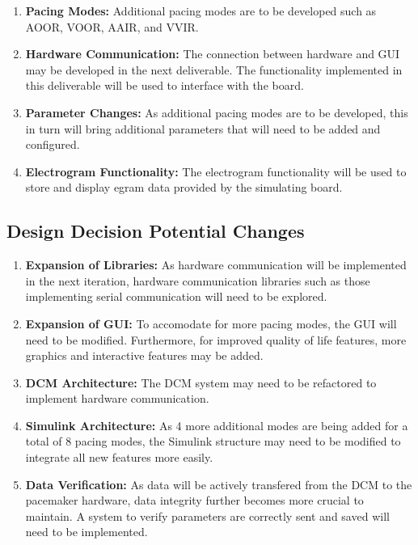 \documentclass{article}
\begin{document}
\begin{enumerate}[label=]
    \item \textbf{Pacing Modes:} Additional pacing modes are to be developed such as AOOR, VOOR, AAIR, and VVIR. 
    \item \textbf{Hardware Communication:} The connection between hardware and GUI may be developed in the next deliverable. 
    The functionality implemented in this deliverable will be used to interface with the board.
    \item \textbf{Parameter Changes:} As additional pacing modes are to be developed, this in turn will bring additional parameters that will 
    need to be added and configured. 
    \item \textbf{Electrogram Functionality:} The electrogram functionality will be used to store and display egram data provided by the 
    simulating board. 
\end{enumerate}


\subsection{Design Decision Potential Changes}

\begin{enumerate}[label=]
    \item \textbf{Expansion of Libraries:} As hardware communication will be implemented in the next iteration, 
    hardware communication libraries such as those implementing serial communication will need to be explored.
    \item \textbf{Expansion of GUI:} To accomodate for more pacing modes, the GUI will need to be modified. Furthermore, 
    for improved quality of life features, more graphics and interactive features may be added. 
    \item \textbf{DCM Architecture:} The DCM system may need to be refactored to implement hardware communication. 
    \item \textbf{Simulink Architecture:} As 4 more additional modes are being added for a total of 8 pacing modes, the 
    Simulink structure may need to be modified to integrate all new features more easily. 
    \item \textbf{Data Verification:} As data will be actively transfered from the DCM to the pacemaker hardware, data integrity further becomes 
    more crucial to maintain. A system to verify parameters are correctly sent and saved will need to be implemented. 
\end{enumerate}
\end{document}
